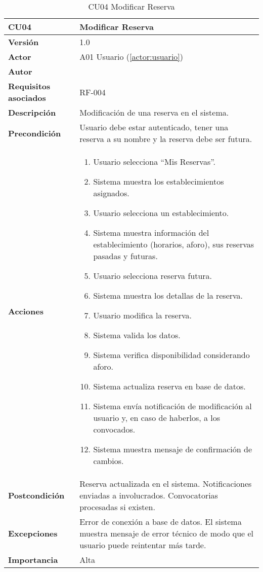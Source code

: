 \begin{table}[H]
	\centering
	\begin{tabularx}{\linewidth}{ p{} p{} }
		\toprule
		\textbf{CU04}    & \textbf{Modificar Reserva} \\
		\toprule
		\textbf{Versión}              & 1.0    \\
		\textbf{Actor}                & A01 Usuario (\ref{actor:usuario}) \\
		\textbf{Autor}                & \nombre \\
		\textbf{Requisitos asociados} & RF-004 \\
		\textbf{Descripción}          & Modificación de una reserva en el sistema. \\
		\textbf{Precondición}         & Usuario debe estar autenticado, tener una reserva a su nombre y la reserva debe ser futura. \\
		\textbf{Acciones}             &
		\begin{enumerate}
			\def\labelenumi{\arabic{enumi}.}
			\tightlist
			\item Usuario selecciona ``Mis Reservas''.
            \item Sistema muestra los establecimientos asignados.
            \item Usuario selecciona un establecimiento.
            \item Sistema muestra información del establecimiento (horarios, aforo), sus reservas pasadas y futuras.
            \item Usuario selecciona reserva futura.
            \item Sistema muestra los detallas de la reserva.
            \item Usuario modifica la reserva.
            \item Sistema valida los datos.
            \item Sistema verifica disponibilidad considerando aforo.
            \item Sistema actualiza reserva en base de datos.
            \item Sistema envía notificación de modificación al usuario y, en caso de haberlos, a los convocados.
            \item Sistema muestra mensaje de confirmación de cambios.
		\end{enumerate}\\
		\textbf{Postcondición}        & Reserva actualizada en el sistema. Notificaciones enviadas a involucrados. Convocatorias procesadas si existen.\\
		\textbf{Excepciones}          & Error de conexión a base de datos. El sistema muestra mensaje de error técnico de modo que el usuario puede reintentar más tarde.\\
		\textbf{Importancia}          & Alta \\
		\bottomrule
	\end{tabularx}
	\caption{CU04 Modificar Reserva}
	\label{cu:modificar-reserva}
\end{table}

